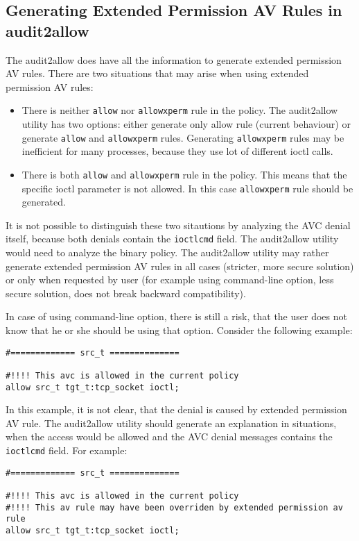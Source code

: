 \subsection{Generating Extended Permission AV Rules in audit2allow}
The audit2allow does have all the information to generate extended permission AV
rules. There are two situations that may arise when using extended permission AV
rules:
\begin{itemize}
    \item There is neither \texttt{allow} nor \texttt{allowxperm} rule in the
        policy. The audit2allow utility has two options: either generate only
        allow rule (current behaviour) or generate \texttt{allow} and
        \texttt{allowxperm} rules. Generating \texttt{allowxperm} rules may be
        inefficient for many processes, because they use lot of different ioctl
        calls.
    \item There is both \texttt{allow} and \texttt{allowxperm} rule in the
        policy. This means that the specific ioctl parameter is not allowed. In
        this case \texttt{allowxperm} rule should be generated.
\end{itemize}

It is not possible to distinguish these two sitautions by analyzing the AVC
denial itself, because both denials contain the \texttt{ioctlcmd} field. The
audit2allow utility would need to analyze the binary policy. The audit2allow
utility may rather generate extended permission AV rules in all cases (stricter,
more secure solution) or only when requested by user (for example using
command-line option, less secure solution, does not break backward
compatibility).

In case of using command-line option, there is still a risk, that the user does
not know that he or she should be using that option. Consider the following
example:
\begin{lstlisting}
#============= src_t ==============

#!!!! This avc is allowed in the current policy
allow src_t tgt_t:tcp_socket ioctl;
\end{lstlisting}
In this example, it is not clear, that the denial is caused by extended
permission AV rule. The audit2allow utility should generate an explanation in
situations, when the access would be allowed and the AVC denial messages
contains the \texttt{ioctlcmd} field. For example:
\begin{lstlisting}
#============= src_t ==============

#!!!! This avc is allowed in the current policy
#!!!! This av rule may have been overriden by extended permission av rule
allow src_t tgt_t:tcp_socket ioctl;
\end{lstlisting}

